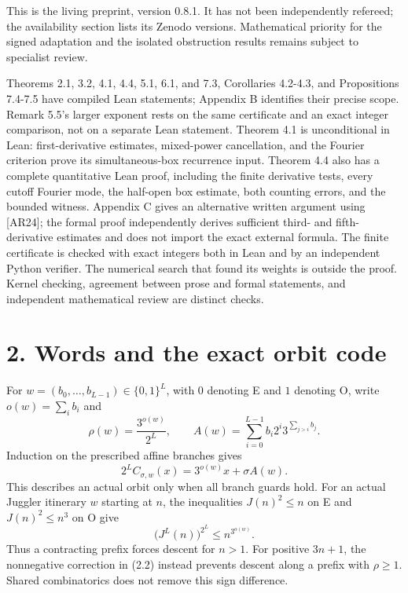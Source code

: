 \documentclass[11pt,a4paper]{article}
\begin{document}
This is the living preprint, version 0.8.1. It has not been
independently refereed; the availability section lists its Zenodo
versions. Mathematical priority for the signed adaptation and the
isolated obstruction results remains subject to specialist review.

Theorems 2.1, 3.2, 4.1, 4.4, 5.1, 6.1, and 7.3, Corollaries 4.2-4.3, and
Propositions 7.4-7.5 have compiled Lean statements; Appendix B
identifies their precise scope. Remark 5.5's larger exponent rests on
the same certificate and an exact integer comparison, not on a separate
Lean statement. Theorem 4.1 is unconditional in Lean: first-derivative
estimates, mixed-power cancellation, and the Fourier criterion prove its
simultaneous-box recurrence input. Theorem 4.4 also has a complete
quantitative Lean proof, including the finite derivative tests, every
cutoff Fourier mode, the half-open box estimate, both counting errors,
and the bounded witness. Appendix C gives an alternative written
argument using {[}AR24{]}; the formal proof independently derives
sufficient third- and fifth-derivative estimates and does not import the
exact external formula. The finite certificate is checked with exact
integers both in Lean and by an independent Python verifier. The
numerical search that found its weights is outside the proof. Kernel
checking, agreement between prose and formal statements, and independent
mathematical review are distinct checks.

\section{2. Words and the exact orbit
code}\label{words-and-the-exact-orbit-code}

For \(w=(b_0,\ldots,b_{L-1})\in\{0,1\}^L\), with \(0\) denoting E and
\(1\) denoting O, write \(o(w)=\sum_i b_i\) and \[
\rho(w)=\frac{3^{o(w)}}{2^L},\qquad
A(w)=\sum_{i=0}^{L-1}b_i2^i3^{\sum_{j>i}b_j}.
\tag{2.1}
\] Induction on the prescribed affine branches gives \[
2^L C_{\sigma,w}(x)=3^{o(w)}x+\sigma A(w).
\tag{2.2}
\] This describes an actual orbit only when all branch guards hold. For
an actual Juggler itinerary \(w\) starting at \(n\), the inequalities
\(J(n)^2\le n\) on E and \(J(n)^2\le n^3\) on O give \[
\bigl(J^L(n)\bigr)^{2^L}\le n^{3^{o(w)}}.
\tag{2.3}
\] Thus a contracting prefix forces descent for \(n>1\). For positive
\(3n+1\), the nonnegative correction in (2.2) instead prevents descent
along a prefix with \(\rho\ge1\). Shared combinatorics does not remove
this sign difference.
\end{document}
